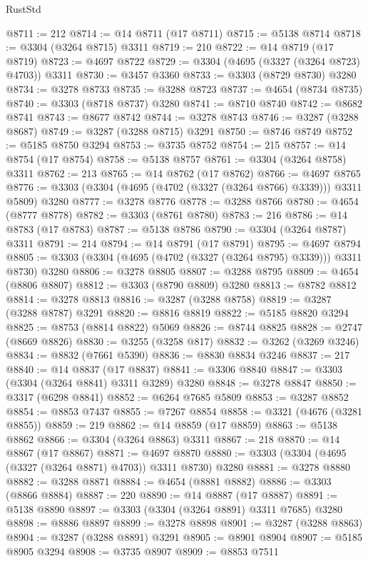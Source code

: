 \begin{lexlean}{RustStd}
\begin{coremodule}
@8711 := 212
@8714 := @14 @8711 (@17 @8711)
@8715 := @5138 @8714
@8718 := @3304 (@3264 @8715) @3311
@8719 := 210
@8722 := @14 @8719 (@17 @8719)
@8723 := @4697 @8722
@8729 := @3304 (@4695 (@3327 (@3264 @8723) @4703)) @3311
@8730 := @3457 @3360
@8733 := @3303 (@8729 @8730) @3280
@8734 := @3278 @8733
@8735 := @3288 @8723
@8737 := @4654 (@8734 @8735)
@8740 := @3303 (@8718 @8737) @3280
@8741 := @8710 @8740
@8742 := @8682 @8741
@8743 := @8677 @8742
@8744 := @3278 @8743
@8746 := @3287 (@3288 @8687)
@8749 := @3287 (@3288 @8715) @3291
@8750 := @8746 @8749
@8752 := @5185 @8750 @3294
@8753 := @3735 @8752
@8754 := 215
@8757 := @14 @8754 (@17 @8754)
@8758 := @5138 @8757
@8761 := @3304 (@3264 @8758) @3311
@8762 := 213
@8765 := @14 @8762 (@17 @8762)
@8766 := @4697 @8765
@8776 := @3303 (@3304 (@4695 (@4702 (@3327 (@3264 @8766) @3339))) @3311 @5809) @3280
@8777 := @3278 @8776
@8778 := @3288 @8766
@8780 := @4654 (@8777 @8778)
@8782 := @3303 (@8761 @8780)
@8783 := 216
@8786 := @14 @8783 (@17 @8783)
@8787 := @5138 @8786
@8790 := @3304 (@3264 @8787) @3311
@8791 := 214
@8794 := @14 @8791 (@17 @8791)
@8795 := @4697 @8794
@8805 := @3303 (@3304 (@4695 (@4702 (@3327 (@3264 @8795) @3339))) @3311 @8730) @3280
@8806 := @3278 @8805
@8807 := @3288 @8795
@8809 := @4654 (@8806 @8807)
@8812 := @3303 (@8790 @8809) @3280
@8813 := @8782 @8812
@8814 := @3278 @8813
@8816 := @3287 (@3288 @8758)
@8819 := @3287 (@3288 @8787) @3291
@8820 := @8816 @8819
@8822 := @5185 @8820 @3294
@8825 := @8753 (@8814 @8822) @5069
@8826 := @8744 @8825
@8828 := @2747 (@8669 @8826)
@8830 := @3255 (@3258 @817)
@8832 := @3262 (@3269 @3246)
@8834 := @8832 (@7661 @5390)
@8836 := @8830 @8834 @3246
@8837 := 217
@8840 := @14 @8837 (@17 @8837)
@8841 := @3306 @8840
@8847 := @3303 (@3304 (@3264 @8841) @3311 @3289) @3280
@8848 := @3278 @8847
@8850 := @3317 (@6298 @8841)
@8852 := @6264 @7685 @5809
@8853 := @3287 @8852
@8854 := @8853 @7437
@8855 := @7267 @8854
@8858 := @3321 (@4676 (@3281 @8855))
@8859 := 219
@8862 := @14 @8859 (@17 @8859)
@8863 := @5138 @8862
@8866 := @3304 (@3264 @8863) @3311
@8867 := 218
@8870 := @14 @8867 (@17 @8867)
@8871 := @4697 @8870
@8880 := @3303 (@3304 (@4695 (@3327 (@3264 @8871) @4703)) @3311 @8730) @3280
@8881 := @3278 @8880
@8882 := @3288 @8871
@8884 := @4654 (@8881 @8882)
@8886 := @3303 (@8866 @8884)
@8887 := 220
@8890 := @14 @8887 (@17 @8887)
@8891 := @5138 @8890
@8897 := @3303 (@3304 (@3264 @8891) @3311 @7685) @3280
@8898 := @8886 @8897
@8899 := @3278 @8898
@8901 := @3287 (@3288 @8863)
@8904 := @3287 (@3288 @8891) @3291
@8905 := @8901 @8904
@8907 := @5185 @8905 @3294
@8908 := @3735 @8907
@8909 := @8853 @7511

\end{coremodule}
\end{lexlean}
